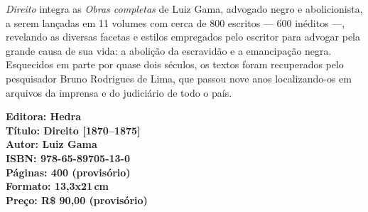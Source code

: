 \textit{Direito} integra as \textit{Obras completas} de Luiz Gama, advogado negro e abolicionista, a serem lançadas em 11 volumes com cerca de 800 escritos --- 600 inéditos ---, revelando as diversas facetas e estilos empregados pelo escritor para advogar pela grande causa de sua vida: a abolição da escravidão e a emancipação negra. Esquecidos em parte por quase dois séculos, os textos foram recuperados pelo pesquisador Bruno Rodrigues de Lima, que passou nove anos localizando-os em arquivos da imprensa e do judiciário de todo o país.

\vfill
\noindent\begin{minipage}[c]{1\linewidth}
{\small\textbf{
\hspace*{-.1cm}Editora: Hedra\\
Título: Direito [1870--1875]\\
Autor: Luiz Gama\\ 
ISBN: 978-65-89705-13-0\\
Páginas: 400 (provisório)\\
Formato: 13,3x21\,cm\\
Preço: R\$ 90,00 (provisório)\\
}}
\end{minipage}
\pagebreak

\vspace*{1.5cm}
\bigskip

\hfill{}
\bigskip
\bigskip
\bigskip

